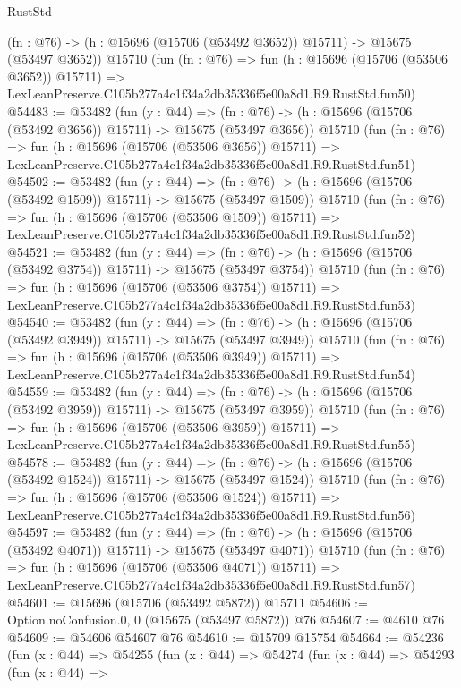 \begin{lexlean}{RustStd}
\begin{coremodule}
    (fn : @76) -> (h : @15696 (@15706 (@53492 @3652)) @15711) -> @15675 (@53497 @3652))
    @15710
    (fun (fn : @76) =>
    fun (h : @15696 (@15706 (@53506 @3652)) @15711) =>
    LexLeanPreserve.C105b277a4c1f34a2db35336f5e00a8d1.R9.RustStd.fun50)
@54483 := @53482
    (fun (y : @44) =>
    (fn : @76) -> (h : @15696 (@15706 (@53492 @3656)) @15711) -> @15675 (@53497 @3656))
    @15710
    (fun (fn : @76) =>
    fun (h : @15696 (@15706 (@53506 @3656)) @15711) =>
    LexLeanPreserve.C105b277a4c1f34a2db35336f5e00a8d1.R9.RustStd.fun51)
@54502 := @53482
    (fun (y : @44) =>
    (fn : @76) -> (h : @15696 (@15706 (@53492 @1509)) @15711) -> @15675 (@53497 @1509))
    @15710
    (fun (fn : @76) =>
    fun (h : @15696 (@15706 (@53506 @1509)) @15711) =>
    LexLeanPreserve.C105b277a4c1f34a2db35336f5e00a8d1.R9.RustStd.fun52)
@54521 := @53482
    (fun (y : @44) =>
    (fn : @76) -> (h : @15696 (@15706 (@53492 @3754)) @15711) -> @15675 (@53497 @3754))
    @15710
    (fun (fn : @76) =>
    fun (h : @15696 (@15706 (@53506 @3754)) @15711) =>
    LexLeanPreserve.C105b277a4c1f34a2db35336f5e00a8d1.R9.RustStd.fun53)
@54540 := @53482
    (fun (y : @44) =>
    (fn : @76) -> (h : @15696 (@15706 (@53492 @3949)) @15711) -> @15675 (@53497 @3949))
    @15710
    (fun (fn : @76) =>
    fun (h : @15696 (@15706 (@53506 @3949)) @15711) =>
    LexLeanPreserve.C105b277a4c1f34a2db35336f5e00a8d1.R9.RustStd.fun54)
@54559 := @53482
    (fun (y : @44) =>
    (fn : @76) -> (h : @15696 (@15706 (@53492 @3959)) @15711) -> @15675 (@53497 @3959))
    @15710
    (fun (fn : @76) =>
    fun (h : @15696 (@15706 (@53506 @3959)) @15711) =>
    LexLeanPreserve.C105b277a4c1f34a2db35336f5e00a8d1.R9.RustStd.fun55)
@54578 := @53482
    (fun (y : @44) =>
    (fn : @76) -> (h : @15696 (@15706 (@53492 @1524)) @15711) -> @15675 (@53497 @1524))
    @15710
    (fun (fn : @76) =>
    fun (h : @15696 (@15706 (@53506 @1524)) @15711) =>
    LexLeanPreserve.C105b277a4c1f34a2db35336f5e00a8d1.R9.RustStd.fun56)
@54597 := @53482
    (fun (y : @44) =>
    (fn : @76) -> (h : @15696 (@15706 (@53492 @4071)) @15711) -> @15675 (@53497 @4071))
    @15710
    (fun (fn : @76) =>
    fun (h : @15696 (@15706 (@53506 @4071)) @15711) =>
    LexLeanPreserve.C105b277a4c1f34a2db35336f5e00a8d1.R9.RustStd.fun57)
@54601 := @15696 (@15706 (@53492 @5872)) @15711
@54606 := Option.noConfusion.{0, 0} (@15675 (@53497 @5872)) @76
@54607 := @4610 @76
@54609 := @54606 @54607 @76
@54610 := @15709 @15754
@54664 := @54236
    (fun (x : @44) =>
    @54255
      (fun (x : @44) =>
      @54274
        (fun (x : @44) =>
        @54293
          (fun (x : @44) =>

\end{coremodule}
\end{lexlean}
